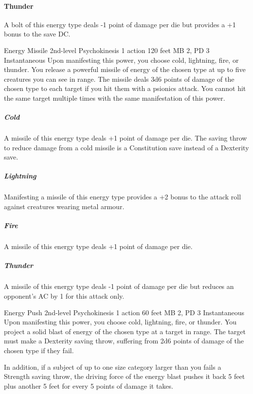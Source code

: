   \paragraph{Thunder}
  A bolt of this energy type deals -1 point of damage per die
  but provides a +1 bonus to the save DC.

\DndPowerHeader%
  {Energy Missile}
  {2nd-level Psychokinesis}
  {1 action}
  {120 feet}
  {MB 2, PD 3}
  {Instantaneous}
  Upon manifesting this power,
  you choose cold,
  lightning,
  fire,
  or thunder.
  You release a powerful missile of energy
  of the chosen type at up to five creatures you can see in range.
  The missile deals 3d6 points of damage of the chosen type
  to each target if you hit them with a psionics attack.
  You cannot hit the same target multiple times
  with the same manifestation of this power.

  \subparagraph{Cold}
  A missile of this energy type deals +1 point of damage per die.
  The saving throw to reduce damage from a cold missile
  is a Constitution save instead of a Dexterity save.
  
  \subparagraph{Lightning}
  Manifesting a missile of this energy type provides
  a +2 bonus to the attack roll against creatures wearing metal armour.
  
  \subparagraph{Fire}
  A missile of this energy type deals +1 point of damage per die.
  
  \subparagraph{Thunder}
  A missile of this energy type deals -1 point of damage per die
  but reduces an opponent's AC by 1 for this attack only.

\DndPowerHeader%
  {Energy Push}
  {2nd-level Psychokinesis}
  {1 action}
  {60 feet}
  {MB 2, PD 3}
  {Instantaneous}
  Upon manifesting this power, you choose cold, lightning, fire, or thunder.
  You project a solid blast of energy of the chosen type at a target in range.
  The target must make a Dexterity saving throw,
  suffering from 2d6 points of damage of the chosen type if they fail.
  
  In addition, if a subject of up to one size category larger than you
  fails a Strength saving throw,
  the driving force of the energy blast pushes it back 5 feet
  plus another 5 feet for every 5 points of damage it takes.
  
